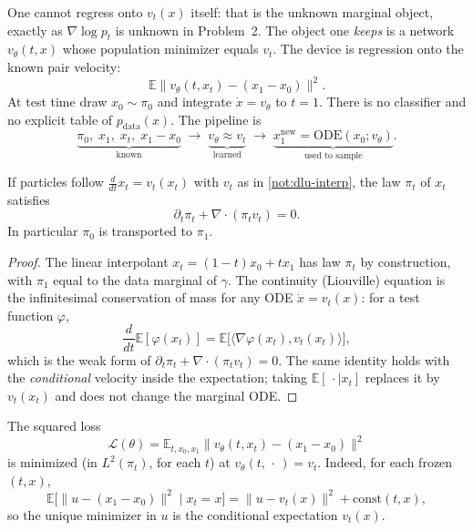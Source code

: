One cannot regress onto \(v_t(x)\) itself: that is the unknown marginal object, exactly as \(\nabla\log p_t\) is unknown in Problem~2. The object one \emph{keeps} is a network \(v_\theta(t,x)\) whose population minimizer equals \(v_t\). The device is regression onto the known pair velocity:
\[
\mathbb{E}\bigl\|v_\theta(t,x_t)-(x_1-x_0)\bigr\|^2.
\]
At test time draw \(x_0\sim\pi_0\) and integrate \(\dot x=v_\theta\) to \(t=1\). There is no classifier and no explicit table of \(p_{\mathrm{data}}(x)\). The pipeline is
\[
\underbrace{\pi_0,\;x_1,\;x_t,\;x_1-x_0}_{\text{known}}
\;\longrightarrow\;
\underbrace{v_\theta\approx v_t}_{\text{learned}}
\;\longrightarrow\;
\underbrace{x_1^{\mathrm{new}}=\mathrm{ODE}(x_0;v_\theta)}_{\text{used to sample}}.
\]

\begin{proposition}
\label{prop:dlu-continuity}
If particles follow \(\frac{d}{dt}x_t=v_t(x_t)\) with \(v_t\) as in \cref{not:dlu-interp}, the law \(\pi_t\) of \(x_t\) satisfies
\[
\partial_t\pi_t+\nabla\cdot(\pi_t v_t)=0.
\]
In particular \(\pi_0\) is transported to \(\pi_1\).
\end{proposition}

\begin{proof}
The linear interpolant \(x_t=(1-t)x_0+tx_1\) has law \(\pi_t\) by construction, with \(\pi_1\) equal to the data marginal of \(\gamma\). The continuity (Liouville) equation is the infinitesimal conservation of mass for any ODE \(\dot x=v_t(x)\): for a test function \(\varphi\),
\[
\frac{d}{dt}\mathbb{E}[\varphi(x_t)]
=
\mathbb{E}\bigl[\langle\nabla\varphi(x_t),v_t(x_t)\rangle\bigr],
\]
which is the weak form of \(\partial_t\pi_t+\nabla\cdot(\pi_t v_t)=0\). The same identity holds with the \emph{conditional} velocity inside the expectation; taking \(\mathbb{E}[\,\cdot\mid x_t]\) replaces it by \(v_t(x_t)\) and does not change the marginal ODE.
\end{proof}

\begin{proposition}
\label{prop:dlu-cfm}
The squared loss
\[
\mathcal{L}(\theta)
=
\mathbb{E}_{t,x_0,x_1}
\bigl\|
v_\theta(t,x_t)-(x_1-x_0)
\bigr\|^2
\]
is minimized (in \(L^2(\pi_t)\), for each \(t\)) at \(v_\theta(t,\,\cdot\,)=v_t\). Indeed, for each frozen \((t,x)\),
\[
\mathbb{E}\bigl[\|u-(x_1-x_0)\|^2\mid x_t=x\bigr]
=
\|u-v_t(x)\|^2
+
\mathrm{const}(t,x),
\]
so the unique minimizer in \(u\) is the conditional expectation \(v_t(x)\).
\end{proposition}

